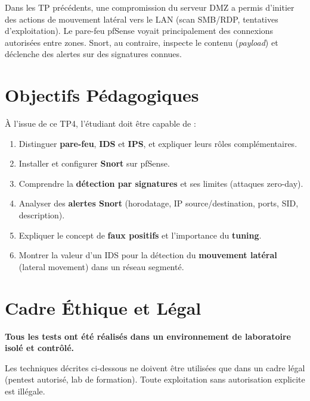 \documentclass[12pt,a4paper,openany]{report}
\begin{document}
	Dans les TP précédents, une compromission du serveur DMZ a permis d'initier des actions de mouvement latéral vers le LAN (scan SMB/RDP, tentatives d'exploitation). Le pare-feu pfSense voyait principalement des connexions autorisées entre zones. Snort, au contraire, inspecte le contenu (\textit{payload}) et déclenche des alertes sur des signatures connues.
	
	\section{Objectifs Pédagogiques}
	
	À l'issue de ce TP4, l'étudiant doit être capable de :
	
	\begin{enumerate}[leftmargin=*]
		\item Distinguer \textbf{pare-feu}, \textbf{IDS} et \textbf{IPS}, et expliquer leurs rôles complémentaires.
		\item Installer et configurer \textbf{Snort} sur pfSense.
		\item Comprendre la \textbf{détection par signatures} et ses limites (attaques zero-day).
		\item Analyser des \textbf{alertes Snort} (horodatage, IP source/destination, ports, SID, description).
		\item Expliquer le concept de \textbf{faux positifs} et l'importance du \textbf{tuning}.
		\item Montrer la valeur d'un IDS pour la détection du \textbf{mouvement latéral} (lateral movement) dans un réseau segmenté.
	\end{enumerate}
	
	\section{Cadre Éthique et Légal}
	
	\begin{tcolorbox}[colback=accent!5!white, colframe=accent, title=\textbf{AVERTISSEMENT LÉGAL}]
		\textbf{Tous les tests ont été réalisés dans un environnement de laboratoire isolé et contrôlé.}
		
		Les techniques décrites ci-dessous ne doivent être utilisées que dans un cadre légal (pentest autorisé, lab de formation). Toute exploitation sans autorisation explicite est illégale.
	\end{tcolorbox}
	
\end{document}
